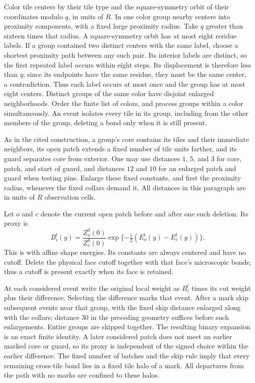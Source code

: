 Color tile centers by their tile type and the square-symmetry orbit of
their coordinates modulo $q$, in units of $R$.  In one color group nearby
centers into proximity components, with a fixed large proximity radius.
Take $q$ greater than sixteen times that radius.  A square-symmetry
orbit has at most eight residue labels.  If a group contained two
distinct centers with the same label, choose a shortest proximity path
between any such pair.  Its interior labels are distinct, so the first
repeated label occurs within eight steps.  Its displacement is therefore
less than $q$; since its endpoints have the same residue, they must be
the same center, a contradiction.  Thus each label occurs at most once
and the group has at most eight centers.
Distinct groups of the same color have disjoint enlarged neighborhoods.
Order the finite list of colors, and process groups within a color
simultaneously.  An event isolates every tile in its group, including
from the other members of the group, deleting a bond only when it is
still present.

As in the cited construction, a group's core contains its tiles and
their immediate neighbors, its open patch extends a fixed number of
tile units farther, and its guard separates core from exterior.  One
may use distances $1$, $5$, and $3$ for core, patch, and start of guard,
and distances $12$ and $10$ for an enlarged patch and guard when testing
pins.  Enlarge these fixed constants, and first the proximity radius,
whenever the fixed collars demand it.  All distances in this paragraph
are in units of $R$ observation cells.

Let $o$ and $c$ denote the current open patch before and after one such
deletion.  Its proxy is
\begin{equation}\label{prep:replacement}
 B_i^l(y)=\frac{Z_o^0(0)}{Z_c^0(0)}
              \exp\{-\tfrac12(E_o^l(y)-E_c^l(y))\}.
\end{equation}
This is \cite[Equation (9.6)]{B} with affine shape
energies.  Its constants are always centered and have no cutoff.  Delete
the physical face cutoff together with that face's microscopic bonds;
thus a cutoff is present exactly when its face is retained.

At each considered event write the original local weight as $B_i^l$
times its cut weight plus their difference.  Selecting the difference
marks that event.  After a mark skip subsequent events near that group,
with the fixed skip distance enlarged along with the collars; distance
$30$ in the preceding geometry suffices before such enlargements.
Entire groups are skipped together.  The resulting binary expansion is
an exact finite identity.  A later considered patch does not meet an
earlier marked core or guard, so its proxy is independent of the signed
choice within the earlier difference.  The fixed number of batches and
the skip rule imply that every remaining cross-tile bond lies in a
fixed tile halo of a mark.  All departures from the path with no marks
are confined to these halos.


